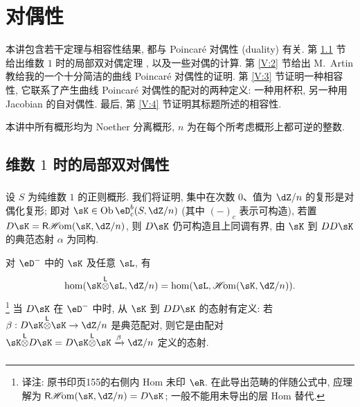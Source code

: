 
\chapter[{对偶性 [Dualit\'e]}]{对偶性}\label{V}

本讲包含若干定理与相容性结果, 都与 Poincaré 对偶性 (duality) 有关.
第 \ref{V:1} 节给出维数 $1$ 时的局部双对偶定理 \cite[I.5.1]{sga5}, 以及一些对偶的计算.
第 \ref{V:2} 节给出 M.\ Artin 教给我的一个十分简洁的曲线 Poincaré 对偶性的证明.
第 \ref{V:3} 节证明一种相容性, 它联系了产生曲线 Poincaré 对偶性的配对的两种定义:
一种用杯积, 另一种用 Jacobian 的自对偶性.
最后, 第 \ref{V:4} 节证明其标题所述的相容性.

本讲中所有概形均为 Noether 分离概形, $n$ 为在每个所考虑概形上都可逆的整数.



\section{维数 \texorpdfstring{$1$}{1} 时的局部双对偶性}\label{V:1}

\subsection{}\label{V:1-1}

设 $S$ 为纯维数 $1$ 的正则概形.
我们将证明, 集中在次数 $0$、值为 $\dZ/n$ 的复形是对偶化复形;
即对 $\sK\in \ob\eD_c^b(S,\dZ/n)$ (其中 $(-)_c$ 表示可构造),
若置 $D\sK=\rHom(\sK,\dZ/n)$, 则 $D\sK$ 仍可构造且上同调有界,
由 $\sK$ 到 $D D\sK$ 的典范态射 $\alpha$ 为同构.

对 $\eD^-$ 中的 $\sK$ 及任意 $\sL$, 有
\[
  \hom(\sK\lotimes \sL,\dZ/n) = \hom(\sL,\Hom(\sK,\dZ/n)) \text{.}
\]
\footnote{译注: 原书印页155的右侧内 Hom 未印 $\eR$. 在此导出范畴的伴随公式中, 应理解为 $\rHom(\sK,\dZ/n)=D\sK$; 一般不能用未导出的层 Hom 替代.}
当 $D\sK$ 在 $\eD^-$ 中时, 从 $\sK$ 到 $DD\sK$ 的态射有定义:
若 $\beta:D\sK\lotimes\sK\to \dZ/n$ 是典范配对,
则它是由配对 $\sK\lotimes D\sK=D\sK\lotimes \sK \xrightarrow\beta \dZ/n$ 定义的态射.

\subsection{}\label{V:1-2}


